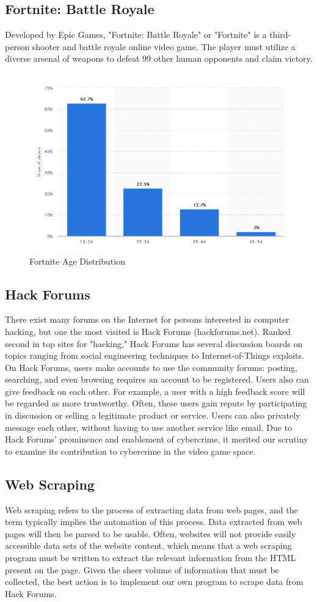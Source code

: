 \documentclass[sigconf]{acmart}
\begin{document}
\subsection{Fortnite: Battle Royale}
Developed by Epic Games, "Fortnite: Battle Royale" or "Fortnite" is a 
third-person shooter and battle royale online video game. The player must
utilize a diverse arsenal of weapons to defeat 99 other human opponents and 
claim victory. 

\begin{figure}[h]
	\centering
	\includegraphics[width=.5\textwidth]{DistributionFortniteAge.png}
	\caption{Fortnite Age Distribution}
\end{figure} \cite{distribage}

\subsection{Hack Forums}
There exist many forums on the Internet for persons interested in computer
hacking, but one the most visited is Hack Forums (hackforums.net). Ranked
second in top sites for "hacking," \cite{alexa} Hack Forums has several discussion boards
on topics ranging from social engineering techniques to Internet-of-Things 
exploits. On Hack Forums, users make accounts to use the community forums:
posting, searching, and even browsing requires an account to be registered.
Users also can give feedback on each other. For example, a user with
a high feedback score will be regarded as more trustworthy. Often, these users
gain repute by participating in discussion or selling a legitimate product or 
service. Users can also privately message each other, without having to use
another service like email. Due to Hack Forums' prominence and enablement of 
cybercrime, it merited our scrutiny to examine its contribution to cybercrime
in the video game space. 

\subsection{Web Scraping}
Web scraping refers to the process of extracting data from web pages, and the 
term typically implies the automation of this process. Data extracted from web
pages will then be parsed to be usable. Often, websites will not provide 
easily accessible data sets of the website content, which means that a 
web scraping program must be written to extract the relevant information from
the HTML present on the page. Given the sheer volume of information that must
be collected, the best action is to implement our own program to scrape data 
from Hack Forums.
\end{document}
